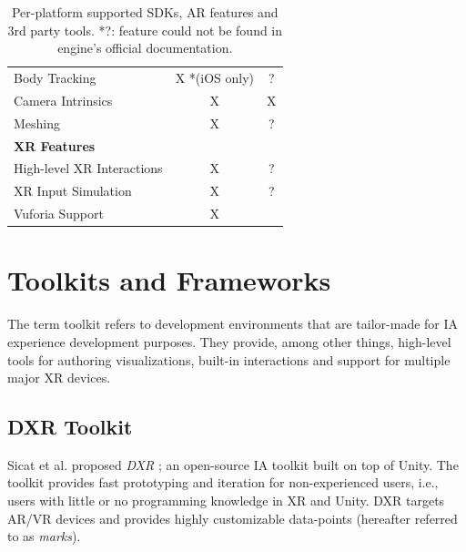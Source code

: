 \documentclass{vgtc}                          %
\begin{document}
\begin{table}
\begin{tabular}{l c c}
		Body Tracking                 & X *(iOS only)                         & ?                        \\
		Camera Intrinsics             & X                                     & X                        \\
		Meshing                       & X                                     & ?                        \\
		\midrule
		\textbf{XR Features}          &                                       &                          \\
		\midrule
		High-level XR Interactions    & X                                     & ?                        \\
		XR Input Simulation           & X                                     & ?                        \\
		\midrule
		Vuforia Support               & X                                     &                          \\
		\bottomrule
	\end{tabular}


	\medskip

	\caption{Per-platform supported SDKs, AR features and 3rd party tools. *?:
		feature could not be found in engine's official documentation.}
	\label{table:1}
\end{table}

\section{Toolkits and Frameworks}

The term toolkit refers to development environments that are tailor-made for
IA experience development purposes. They provide, among other things,
high-level tools for authoring visualizations, built-in interactions and
support for multiple major XR devices.

\subsection{DXR Toolkit}

\noindent Sicat et al. proposed \textit{DXR} \cite{dxr_toolkit}; an open-source \cite{dxr:repo} IA toolkit
built on top of Unity. The toolkit provides fast prototyping and iteration for non-experienced users, i.e.,
users with little or no programming knowledge in XR and Unity. DXR targets AR/VR devices and provides highly
customizable data-points (hereafter referred to as \textit{marks}). 
\end{document}

